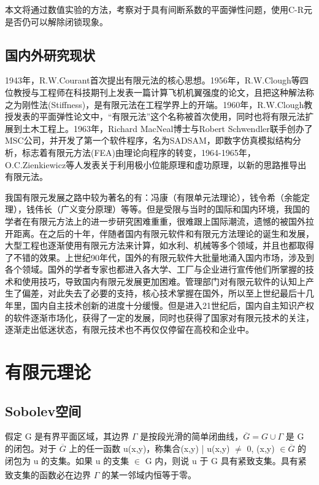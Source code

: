 \documentclass[a4paper,UTF8,titlepage]{ctexart}
\begin{document}
本文将通过数值实验的方法，考察对于具有间断系数的平面弹性问题，使用C-R元是否仍可以解除闭锁现象。

\subsection{国内外研究现状}

1943年，R.W.Courant首次提出有限元法的核心思想。1956年，R.W.Clough等四位教授与工程师在科技期刊上发表一篇计算飞机机翼强度的论文，且把这种解法称之为刚性法(Stiffness)，是有限元法在工程学界上的开端。1960年，R.W.Clough教授发表的平面弹性论文中，“有限元法”这个名称被首次使用，同时也将有限元法扩展到土木工程上。1963年，Richard MacNeal博士与Robert Schwendler联手创办了MSC公司，并开发了第一个软件程序，名为SADSAM，即数字仿真模拟结构分析，标志着有限元方法(FEA)由理论向程序的转变，1964-1965年，O.C.Zienkiewicz等人发表关于利用极小位能原理和虚功原理，以新的思路推导出有限元法。

我国有限元发展之路中较为著名的有：冯康（有限单元法理论），钱令希（余能定理），钱伟长（广义变分原理）等等。但是受限与当时的国际和国内环境，我国的学者在有限元方法上的进一步研究困难重重，很难跟上国际潮流，遗憾的被国外拉开距离。在之后的十年，伴随者国内有限元软件和有限元方法理论的诞生和发展，大型工程也逐渐使用有限元方法来计算，如水利、机械等多个领域，并且也都取得了不错的效果。上世纪90年代，国外的有限元软件大批量地涌入国内市场，涉及到各个领域。国外的学者专家也都进入各大学、工厂与企业进行宣传他们所掌握的技术和使用技巧，导致国内有限元发展更加困难。管理部门对有限元软件的认知上产生了偏差，对此失去了必要的支持，核心技术掌握在国外，所以至上世纪最后十几年里，国内自主技术创新的进度十分缓慢。但是进入21世纪后，国内自主知识产权的软件逐渐市场化，获得了一定的发展，同时也获得了国家对有限元技术的关注，逐渐走出低迷状态，有限元技术也不再仅仅停留在高校和企业中。

\section{有限元理论}

\subsection{Sobolev空间}

假定 G 是有界平面区域，其边界 $\Gamma$ 是按段光滑的简单闭曲线，$\overline{G} = G \cup \Gamma$ 是 G 的闭包。对于 $\overline{G}$ 上的任一函数 u(x,y)，称集合{(x,y) | u(x,y) $\ne$ 0, (x,y) $\in \overline{G}$} 的闭包为 u 的支集。如果 u 的支集 $\in$ G 内，则说 u 于 G 具有紧致支集。具有紧致支集的函数必在边界 $\Gamma$ 的某一邻域内恒等于零\textsuperscript{\cite{李荣华2007偏微分方程数值解}}。
\end{document}
